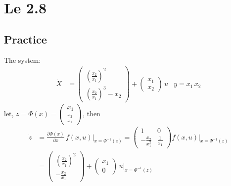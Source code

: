 \section{Le 2.8}

\subsection*{Practice}

The system:
\begin{align*}
    \dot X &= \begin{pmatrix}
        \left(\frac{x_2}{x_1}\right)^2 \\ \left(\frac{x_2}{x_1}\right)^3 - x_2
    \end{pmatrix} + \begin{pmatrix}
        x_1\\x_2
    \end{pmatrix}\,u & y = x_1\,x_2
\end{align*}
let, $z = \Phi(x) = \begin{pmatrix}
    x_1 \\ \frac{x_2}{x_1}
\end{pmatrix}$, then 
\begin{align*}
    \dot z &= \frac{\partial\Phi\left(x\right)}{\partial x}\, f\left(x,u\right)\Bigg|_{x = \Phi^{-1}(z)} = \begin{pmatrix} 1 & 0 \\ -\frac{x_2}{x_1^2} & \frac{1}{x_1}\end{pmatrix} f\left(x,u\right)\Bigg|_{x = \Phi^{-1}(z)} \\
    &= \begin{pmatrix}
        \left(\frac{x_2}{x_1}\right)^2 \\ -\frac{x_2}{x_1}
    \end{pmatrix} + \begin{pmatrix}
        x_1 \\ 0
    \end{pmatrix}\,u\Bigg|_{x = \Phi^{-1}(z)} 
\end{align*}
